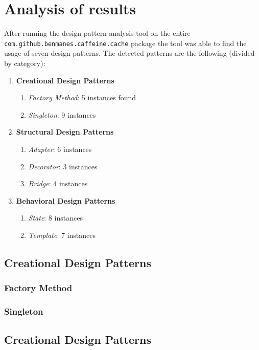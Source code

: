 \section{Analysis of results}

After running the design pattern analysis tool on the entire \texttt{com.github.benmanes.caffeine.cache} package the tool was able to find the usage of seven design patterns. The detected patterns are the following (divided by category):

\begin{enumerate}
  \item \textbf{Creational Design Patterns}
  \begin{enumerate}
    \item \textit{Factory Method}: 5 instances found
    \item \textit{Singleton}: 9 instances
  \end{enumerate}
  \item \textbf{Structural Design Patterns}
  \begin{enumerate}
    \item \textit{Adapter}: 6 instances
    \item \textit{Decorator}: 3 instances
    \item \textit{Bridge}: 4 instances
  \end{enumerate}
  \item \textbf{Behavioral Design Patterns}
  \begin{enumerate}
    \item \textit{State}: 8 instances
    \item \textit{Template}: 7 instances
  \end{enumerate}
\end{enumerate}

\subsection{Creational Design Patterns}

\subsubsection{Factory Method}

\subsubsection{Singleton}

\subsection{Creational Design Patterns} 

